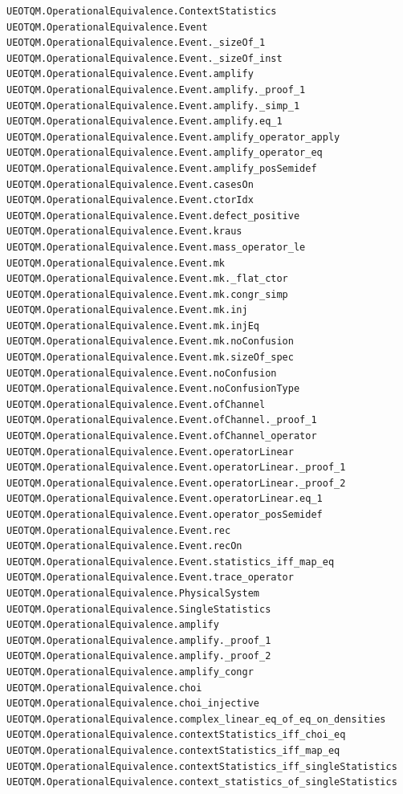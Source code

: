 \documentclass[
  11pt,
  oneside]{book}
\begin{document}
\begin{Verbatim}[breaklines,breakanywhere,fontsize=\scriptsize]
UEOTQM.OperationalEquivalence.ContextStatistics
UEOTQM.OperationalEquivalence.Event
UEOTQM.OperationalEquivalence.Event._sizeOf_1
UEOTQM.OperationalEquivalence.Event._sizeOf_inst
UEOTQM.OperationalEquivalence.Event.amplify
UEOTQM.OperationalEquivalence.Event.amplify._proof_1
UEOTQM.OperationalEquivalence.Event.amplify._simp_1
UEOTQM.OperationalEquivalence.Event.amplify.eq_1
UEOTQM.OperationalEquivalence.Event.amplify_operator_apply
UEOTQM.OperationalEquivalence.Event.amplify_operator_eq
UEOTQM.OperationalEquivalence.Event.amplify_posSemidef
UEOTQM.OperationalEquivalence.Event.casesOn
UEOTQM.OperationalEquivalence.Event.ctorIdx
UEOTQM.OperationalEquivalence.Event.defect_positive
UEOTQM.OperationalEquivalence.Event.kraus
UEOTQM.OperationalEquivalence.Event.mass_operator_le
UEOTQM.OperationalEquivalence.Event.mk
UEOTQM.OperationalEquivalence.Event.mk._flat_ctor
UEOTQM.OperationalEquivalence.Event.mk.congr_simp
UEOTQM.OperationalEquivalence.Event.mk.inj
UEOTQM.OperationalEquivalence.Event.mk.injEq
UEOTQM.OperationalEquivalence.Event.mk.noConfusion
UEOTQM.OperationalEquivalence.Event.mk.sizeOf_spec
UEOTQM.OperationalEquivalence.Event.noConfusion
UEOTQM.OperationalEquivalence.Event.noConfusionType
UEOTQM.OperationalEquivalence.Event.ofChannel
UEOTQM.OperationalEquivalence.Event.ofChannel._proof_1
UEOTQM.OperationalEquivalence.Event.ofChannel_operator
UEOTQM.OperationalEquivalence.Event.operatorLinear
UEOTQM.OperationalEquivalence.Event.operatorLinear._proof_1
UEOTQM.OperationalEquivalence.Event.operatorLinear._proof_2
UEOTQM.OperationalEquivalence.Event.operatorLinear.eq_1
UEOTQM.OperationalEquivalence.Event.operator_posSemidef
UEOTQM.OperationalEquivalence.Event.rec
UEOTQM.OperationalEquivalence.Event.recOn
UEOTQM.OperationalEquivalence.Event.statistics_iff_map_eq
UEOTQM.OperationalEquivalence.Event.trace_operator
UEOTQM.OperationalEquivalence.PhysicalSystem
UEOTQM.OperationalEquivalence.SingleStatistics
UEOTQM.OperationalEquivalence.amplify
UEOTQM.OperationalEquivalence.amplify._proof_1
UEOTQM.OperationalEquivalence.amplify._proof_2
UEOTQM.OperationalEquivalence.amplify_congr
UEOTQM.OperationalEquivalence.choi
UEOTQM.OperationalEquivalence.choi_injective
UEOTQM.OperationalEquivalence.complex_linear_eq_of_eq_on_densities
UEOTQM.OperationalEquivalence.contextStatistics_iff_choi_eq
UEOTQM.OperationalEquivalence.contextStatistics_iff_map_eq
UEOTQM.OperationalEquivalence.contextStatistics_iff_singleStatistics
UEOTQM.OperationalEquivalence.context_statistics_of_singleStatistics

\end{Verbatim}
\end{document}
